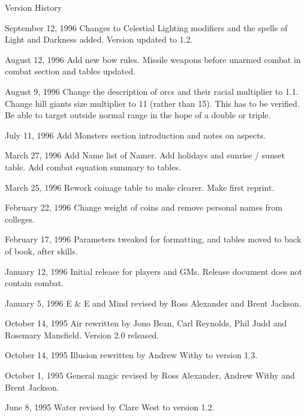 \begin{Chapter}{Version History}
\begin{Description}
\item[September 12, 1996] Changes to Celestial Lighting modifiers and
  the spells of Light and Darkness added. Version updated to 1.2.

\item[August 12, 1996] Add new bow rules.  Missile weapons before
  unarmed combat in combat section and tables updated.

\item[August 9, 1996] Change the description of orcs and their racial
  multiplier to 1.1. Change hill giants size multiplier to 11 (rather
  than 15).  This has to be verified.  Be able to target outside
  normal range in the hope of a double or triple.

\item[July 11, 1996] Add Monsters section introduction and notes on
  aspects.

\item[March 27, 1996] Add Name list of Namer.  Add holidays and
  sunrise / sunset table.  Add combat equation summary to tables.

\item[March 25, 1996] Rework coinage table to make clearer. Make first
  reprint.

\item[February 22, 1996] Change weight of coins and remove personal
  names from colleges.

\item[February 17, 1996] Parameters tweaked for formatting, and tables
  moved to back of book, after skills.

\item[January 12, 1996] Initial release for players and GMs. Release
  document does not contain combat.

\item[January 5, 1996] E \& E and Mind revised by Ross Alexander and
  Brent Jackson.

\item[October 14, 1995] Air rewritten by Jono Bean, Carl Reynolds,
  Phil Judd and Rosemary Mansfield.  Version 2.0 released.

\item[October 14, 1995] Illusion rewritten by Andrew Withy to version
  1.3.

\item[October 1, 1995] General magic revised by Ross Alexander, Andrew
  Withy and Brent Jackson.

\item[June 8, 1995] Water revised by Clare West to version 1.2.


\end{Description}
\end{Chapter}
